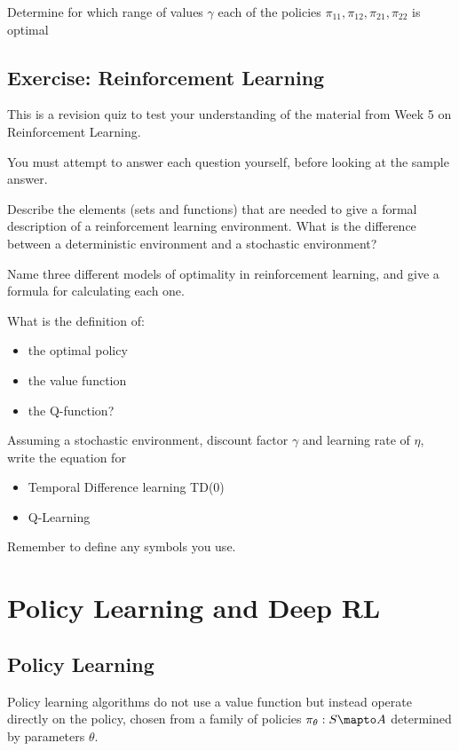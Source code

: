 \documentclass[11pt]{article}
\begin{document}
Determine for which range of values $\gamma$ each of the policies
$\pi_{11}, \pi_{12}, \pi_{21}, \pi_{22}$ is optimal


\subsection{Exercise: Reinforcement Learning}\label{subsec:exercise:-reinforcement-learning2}
This is a revision quiz to test your understanding of the material from Week 5 on Reinforcement Learning.

You must attempt to answer each question yourself, before looking at the sample answer.

Describe the elements (sets and functions) that are needed to give a formal
description of a reinforcement learning environment.
What is the difference between a deterministic environment and a stochastic
environment?


Name three different models of optimality in reinforcement learning, and give
a formula for calculating each one.


What is the definition of:
\begin{itemize}
    \item the optimal policy
    \item the value function
    \item the Q-function?
\end{itemize}


Assuming a stochastic environment, discount factor $\gamma$ and learning rate
of $\eta$, write the equation for
\begin{itemize}
    \item Temporal Difference learning TD(0)
    \item Q-Learning
\end{itemize}
Remember to define any symbols you use.


\section{Policy Learning and Deep RL}\label{sec:policy-learning-and-deep-rl}

\subsection{Policy Learning}\label{subsec:policy-learning}
Policy learning algorithms do not use a value function but instead operate
directly on the policy, chosen from a family of policies
$\pi_{\theta}: S \mapto A$ determined by parameters $\theta$.
\end{document}

